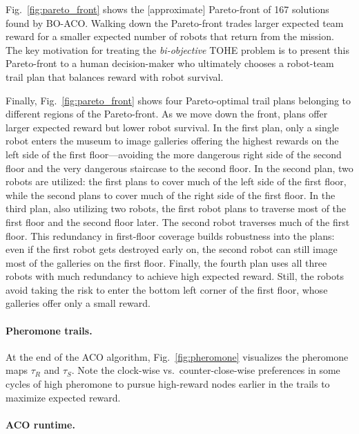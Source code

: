 \documentclass[fleqn,10pt,lineno]{wlpeerj}
\begin{document}
Fig.~\ref{fig:pareto_front} shows the [approximate] Pareto-front of 167 solutions found by BO-ACO. 
Walking down the Pareto-front trades larger expected team reward for a smaller expected number of robots that return from the mission. The key motivation for treating the \emph{bi-objective} TOHE problem is to present this Pareto-front to a human decision-maker who ultimately chooses a robot-team trail plan that balances reward with robot survival.

Finally, Fig.~\ref{fig:pareto_front} shows four Pareto-optimal trail plans belonging to different regions of the Pareto-front. 
As we move down the front, plans offer larger expected reward but lower robot survival.
In the first plan, only a single robot enters the museum to image galleries offering the highest rewards on the left side of the first floor---avoiding the more dangerous right side of the second floor and the very dangerous staircase to the second floor. 
In the second plan, two robots are utilized: the first plans to cover much of the left side of the first floor, while the second plans to cover much of the right side of the first floor.
In the third plan, also utilizing two robots, the first robot plans to traverse most of the first floor and the second floor later. The second robot traverses much of the first floor. This redundancy in first-floor coverage builds robustness into the plans: even if the first robot gets destroyed early on, the second robot can still image most of the galleries on the first floor.
Finally, the fourth plan uses all three robots with much redundancy to achieve high expected reward. Still, the robots avoid taking the risk to enter the bottom left corner of the first floor, whose galleries offer only a small reward.

\paragraph{Pheromone trails.}
At the end of the ACO algorithm, Fig.~\ref{fig:pheromone} visualizes the pheromone maps $\tau_{R}$ and $\tau_S$.
 Note the clock-wise vs.\ counter-close-wise preferences in some cycles of high pheromone to pursue high-reward nodes earlier in the trails to maximize expected reward.

\paragraph{ACO runtime.}
\end{document}
